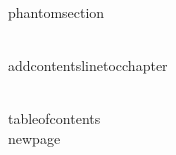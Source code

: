  
 

\\phantomsection
 
\\addcontentsline{toc}{chapter}{\contentsname}
 
\\tableofcontents
\\newpage

